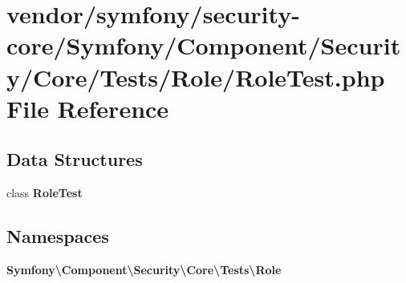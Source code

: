 \section{vendor/symfony/security-\/core/\+Symfony/\+Component/\+Security/\+Core/\+Tests/\+Role/\+Role\+Test.php File Reference}
\label{_role_test_8php}
\subsection*{Data Structures}
\begin{DoxyCompactItemize}
\item 
class {\bf Role\+Test}
\end{DoxyCompactItemize}
\subsection*{Namespaces}
\begin{DoxyCompactItemize}
\item 
 {\bf Symfony\textbackslash{}\+Component\textbackslash{}\+Security\textbackslash{}\+Core\textbackslash{}\+Tests\textbackslash{}\+Role}
\end{DoxyCompactItemize}
